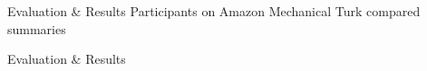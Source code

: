 \documentclass{beamer}
\begin{document}
  \begin{frame}{Evaluation \& Results}
    Participants on Amazon Mechanical Turk compared summaries

  \end{frame}

  \begin{frame}{Evaluation \& Results}
	\begin{center}
	\end{center}
  \end{frame}
\end{document}
